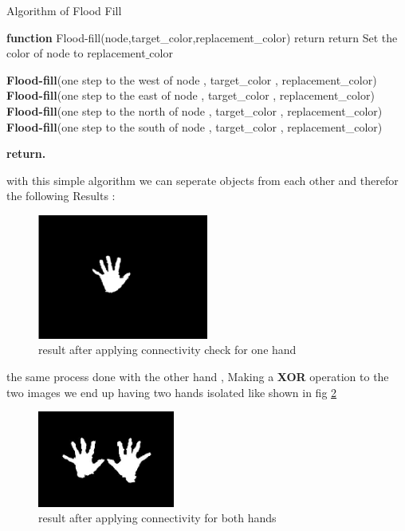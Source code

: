\begin{algorithm}

\caption{Algorithm of Flood Fill }

\textbf{function}  Flood-fill(node,target\_color,replacement\_color) 
\newline
{}
    {
     return
    }
\newline
{}
    {
     return
    }
Set the color of node to replacement$\_$color 


\textbf{Flood-fill}(one step to the west of node , target\_color , replacement\_color)\\
\textbf{Flood-fill}(one step to the east of node , target\_color , replacement\_color)\\
\textbf{Flood-fill}(one step to the north of node , target\_color , replacement\_color)\\
\textbf{Flood-fill}(one step to the south of node , target\_color , replacement\_color)
\newline

\textbf{return.} 
\end{algorithm}
\newline

with this simple algorithm we can seperate objects from each other and therefor the following  Results : \\
 
 \begin{figure}[H]
\centering
\includegraphics[width=0.5\textwidth]{img/finalresult.png}
\caption{result after applying connectivity check for one hand  }
\label{fig:cam11}
\end{figure}


the same process done with the other hand , Making a \textbf{XOR } operation to the two images we end up having two hands isolated like shown in fig \ref{fig:twohd}

 \begin{figure}[H]
\centering
\includegraphics[width=0.4\textwidth]{img/twohands.jpg}
\caption{result after applying connectivity for both hands  }
\label{fig:twohd}
\end{figure}

